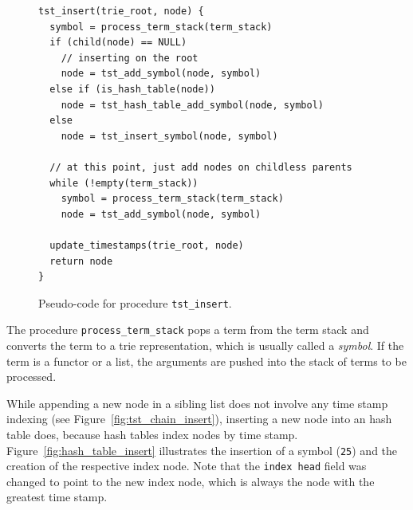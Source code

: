 \begin{figure}[ht]
\begin{Verbatim}
tst_insert(trie_root, node) {
  symbol = process_term_stack(term_stack)
  if (child(node) == NULL)
    // inserting on the root
    node = tst_add_symbol(node, symbol)
  else if (is_hash_table(node))
    node = tst_hash_table_add_symbol(node, symbol)
  else
    node = tst_insert_symbol(node, symbol)
  
  // at this point, just add nodes on childless parents
  while (!empty(term_stack))
    symbol = process_term_stack(term_stack)
    node = tst_add_symbol(node, symbol)
  
  update_timestamps(trie_root, node)
  return node
}
\end{Verbatim}
\caption{Pseudo-code for procedure \texttt{tst\_insert}.}
\label{fig:tst_insert}
\end{figure}

The procedure \texttt{process\_term\_stack} pops a term from the term stack and converts the term
to a trie representation, which is usually called a \textit{symbol}. If the term is a functor or a list,
the arguments are pushed into the stack of terms to be processed.

While appending a new node in a sibling list does not involve any
time stamp indexing (see Figure~\ref{fig:tst_chain_insert}), inserting a new node into an hash table does,
because hash tables index nodes by time stamp.
Figure~\ref{fig:hash_table_insert}
illustrates the insertion of a symbol (\texttt{25}) and the creation of the respective
index node. Note that the \texttt{index head} field was changed to point to the new index node,
which is always the node with the greatest time stamp.

